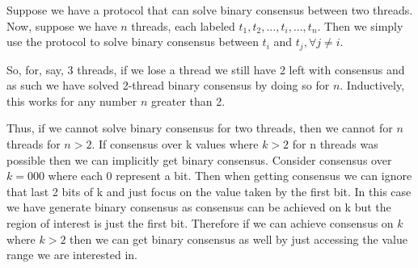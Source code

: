 \documentclass[11pt,letterpaper]{exam}
\begin{document}
\begin{questions}
		\question
		
		\question
			Suppose we have a protocol that can solve binary consensus between two threads.
			Now, suppose we have $n$ threads, each labeled $t_1, t_2, ..., t_i, ..., t_n$.
			Then we simply use the protocol to solve binary consensus between $t_i$ and $t_j, \forall j \neq i$.
			
			So, for, say, 3 threads, if we lose a thread we still have 2 left with consensus and as such we have solved 2-thread binary consensus by doing so for $n$.
			Inductively, this works for any number $n$ greater than 2.
			
			Thus, if we cannot solve binary consensus for two threads, then we cannot for $n$ threads for $n>2$.
		\question
			If consensus over k values where $k>2$ for n threads was possible then we can implicitly get binary consensus. Consider consensus over $k=000$ where each 0 represent a bit. Then when getting consensus we can ignore that last 2 bits of k and just focus on the value taken by the first bit. In this case we have generate binary consensus as consensus can be achieved on k but the region of interest is just the first bit. Therefore if we can achieve consensus on $k$ where $k>2$ then we can get binary consensus as well by just accessing the value range we are interested in.
	\end{questions}
	
\end{document}
